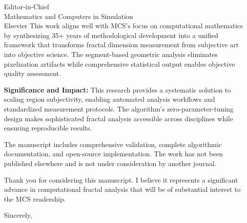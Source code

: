 \documentclass[11pt]{letter}
\begin{document}
\begin{letter}{Editor-in-Chief\\
Mathematics and Computers in Simulation\\
Elsevier}
This work aligns well with MCS's focus on computational mathematics by synthesizing 35+ years of methodological development into a unified framework that transforms fractal dimension measurement from subjective art into objective science. The segment-based geometric analysis eliminates pixelization artifacts while comprehensive statistical output enables objective quality assessment.

\textbf{Significance and Impact:} This research provides a systematic solution to scaling region subjectivity, enabling automated analysis workflows and standardized measurement protocols. The algorithm's zero-parameter-tuning design makes sophisticated fractal analysis accessible across disciplines while ensuring reproducible results.

The manuscript includes comprehensive validation, complete algorithmic documentation, and open-source implementation. The work has not been published elsewhere and is not under consideration by another journal.

Thank you for considering this manuscript. I believe it represents a significant advance in computational fractal analysis that will be of substantial interest to the MCS readership.

\closing{Sincerely,}

\end{letter}
\end{document}
